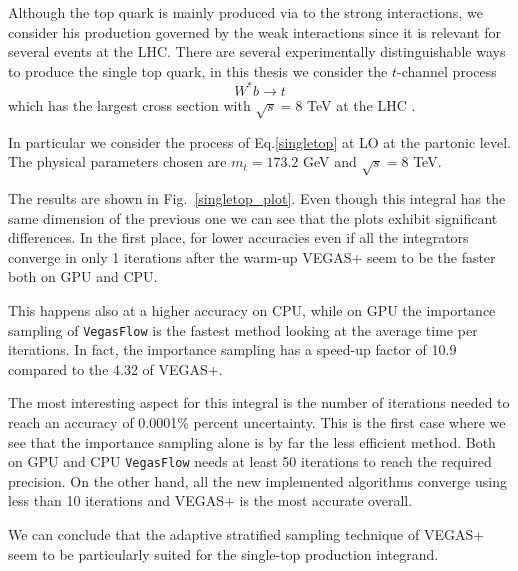 \documentclass[../main/main.tex]{subfiles}
\begin{document}
Although the top quark is mainly produced via to the strong interactions, we consider his production governed by the weak interactions since it is relevant for several events at the LHC. There are several experimentally distinguishable ways to produce the single top quark, in this thesis we consider the $t$-channel process 
\begin{equation}
	\label{singletop}
	W^* b \to t 
\end{equation}
which has the largest cross section with  $\sqrt{s} = 8$ TeV at the LHC \cite{Brucherseifer_2014}.

In particular we consider the process of Eq.\eqref{singletop} at LO at the partonic level. The physical parameters chosen are $m_t = 173.2$ GeV and $\sqrt{s} = 8$ TeV.

The results are shown in Fig.~\ref{singletop_plot}.
Even though this integral has the same dimension of the previous one we can see that the plots exhibit significant differences.
In the first place, for lower accuracies even if all the integrators converge in only 1 iterations after the warm-up VEGAS+ seem to be the faster both on GPU and CPU. 

This happens also at a higher accuracy on CPU, while on GPU the importance sampling of \texttt{VegasFlow} is the fastest method looking at the average time per iterations. In fact, the importance sampling has a speed-up factor of 10.9 compared to the 4.32 of VEGAS+.

The most interesting aspect for this integral is the number of iterations needed to reach an accuracy of 0.0001\% percent uncertainty.  This is the first case where we see that the importance sampling alone is by far the less efficient method. Both on GPU and CPU \texttt{VegasFlow} needs at least 50 iterations to reach the required precision. On the other hand, all the new implemented algorithms converge using less than 10 iterations and VEGAS+ is the most accurate overall.

We can conclude that the adaptive stratified sampling technique of VEGAS+ seem to be particularly suited for the single-top production integrand.
\end{document}
